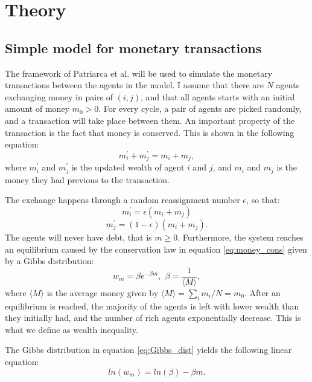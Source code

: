 \documentclass[11pt,a4paper,titlepage]{article}
\begin{document}
\section{Theory}
\subsection{Simple model for monetary transactions}
The framework of Patriarca et al. \cite{Patriarca} will be used to simulate the monetary transactions between the agents in the model. I assume that there are $N$ agents exchanging money in pairs of $(i,j)$, and that all agents starts with an initial amount of money $m_0 > 0$. For every cycle, a pair of agents are picked randomly, and a transaction will take place between them. An important property of the transaction is the fact that money is conserved. This is shown in the following equation:
\begin{equation}
\label{eq:money_cons}
m_{i}^{'} + m_{j}^{'} = m_{i}+m_{j},
\end{equation}
where $m_{i}^{'}$ and $m_{j}^{'}$ is the updated wealth of agent $i$ and $j$, and $m_{i}$ and $m_{j}$ is the money they had previous to the transaction. 

The exchange happens through a random reassignment number $\epsilon$, so that:
\begin{equation}
m_{i}^{'} = \epsilon(m_{i}+m_{j})
\end{equation}
\begin{equation}
m_{j}^{'} = (1-\epsilon)(m_{i}+m_{j}).
\end{equation}
The agents will never have debt, that is $m\geq0$. Furthermore, the system reaches an equilibrium caused by the conservation law in equation  \ref{eq:money_cons} given by a Gibbs distribution:
\begin{equation}
\label{eq:Gibbs_dist}
w_{m} = \beta e^{-\beta m}, \ \, \beta = \frac{1}{\langle M\rangle},
\end{equation}
where $\langle M\rangle$ is the average money given by $\langle M\rangle = \sum_i m_i/N = m_0$. After an equilibrium is reached, the majority of the agents is left with lower wealth than they initially had, and the number of rich agents exponentially decrease. This is what we define as wealth inequality.

The Gibbs distribution in equation \ref{eq:Gibbs_dist} yields the following linear equation:
\begin{equation}
\label{eq:lin_gibbs}
ln(w_m) = ln(\beta)-\beta m.
\end{equation}
\end{document}
